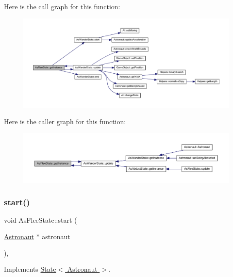 Here is the call graph for this function\+:
\nopagebreak
\begin{figure}[H]
\begin{center}
\leavevmode
\includegraphics[width=350pt]{class_as_flee_state_ac997349091ed80416dfe2700bae5f726_cgraph}
\end{center}
\end{figure}
Here is the caller graph for this function\+:
\nopagebreak
\begin{figure}[H]
\begin{center}
\leavevmode
\includegraphics[width=350pt]{class_as_flee_state_ac997349091ed80416dfe2700bae5f726_icgraph}
\end{center}
\end{figure}
\mbox{\label{class_as_flee_state_a73dfdf7af46e5bce0b212030413cd00c}} 
\subsubsection{\texorpdfstring{start()}{start()}}
{\footnotesize\ttfamily void As\+Flee\+State\+::start (\begin{DoxyParamCaption}\item[{\hyperlink{class_astronaut}{Astronaut} $\ast$}]{astronaut }\end{DoxyParamCaption})\hspace{0.3cm}{\ttfamily [override]}, {\ttfamily [virtual]}}



Implements \hyperlink{class_state_abc29d36b0462a306ac9b32f36571d783}{State$<$ Astronaut $>$}.


